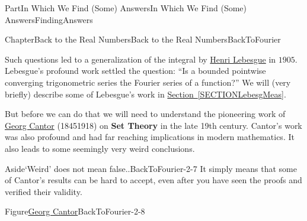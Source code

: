 \documentclass[oneside,10pt,]{book}
\newcommand{\xreffont}{\relax}
\newcommand{\terminology}[1]{\textbf{#1}}
\numberwithin{equation}{part}
\begin{document}
\begin{partptx}{Part}{In Which We Find (Some) Answers}{}{In Which We Find (Some) Answers}{}{}{FindingAnswers}
\begin{chapterptx}{Chapter}{Back to the Real Numbers}{}{Back to the Real Numbers}{}{}{BackToFourier}
\begin{introduction}{}
\par
{} Such questions led to a generalization of the integral by \href{https://mathshistory.st-andrews.ac.uk/Biographies/Lebesgue/}{Henri Lebesgue} in \(1905\).  Lebesgue's profound work settled the question: ``Is a bounded pointwise converging trigonometric series the Fourier series of a function?'' We will (very briefly) describe some of Lebesgue's work in \hyperref[SECTIONLebesgMeas]{Section~{\xreffont\ref{SECTIONLebesgMeas}}}.%
\par
But before we can do that we will need to understand the pioneering work of \href{https://mathshistory.st-andrews.ac.uk/Biographies/Cantor/}{Georg Cantor} (1845\textendash{}1918) on \terminology{Set Theory} in the late 19th century. Cantor's work was also profound and had far reaching implications in modern mathematics.  It also leads to some seemingly very weird conclusions.%
\begin{aside}{Aside}{`Weird' does not mean false..}{BackToFourier-2-7}%
It simply means that some of Cantor's results can be hard to accept, even after you have seen the proofs and verified their validity.%
\end{aside}
\begin{figureptx}{Figure}{\href{https://mathshistory.st-andrews.ac.uk/Biographies/Cantor/}{Georg Cantor}}{BackToFourier-2-8}{}%
%
%
\begin{image}{0.325}{0.35}{0.325}{}%

\end{image}
\end{figureptx}
\end{introduction}
\end{chapterptx}
\end{partptx}
\end{document}
